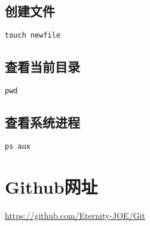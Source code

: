 \documentclass[a4paper, 12pt]{article}
\begin{document}
\newpage
\subsection{创建文件}
\begin{lstlisting}
touch newfile
\end{lstlisting}

\subsection{查看当前目录}
\begin{lstlisting}
pwd
\end{lstlisting}

\subsection{查看系统进程}
\begin{lstlisting}
ps aux
\end{lstlisting}


\newpage
\section{Github网址}
\href{https://github.com/Eternity-JOE/Git}{https://github.com/Eternity-JOE/Git}
\end{document}
